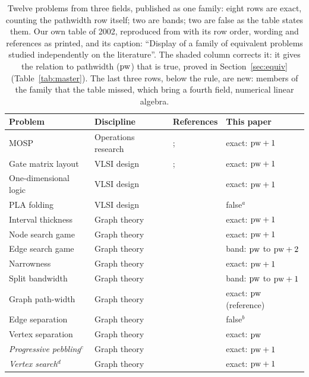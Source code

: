 \begin{table}[tbp]
\centering
\caption{Twelve problems from three fields, published as one family: eight
rows are exact, counting the pathwidth row itself; two are bands; two are false
as the table states them. Our own table of 2002, reproduced from
\citet[Table~1, p.~1764]{LY2002} with its row order, wording and references as
printed, and its caption: ``Display of a family of equivalent problems studied
independently on the literature''. The shaded column corrects it: it gives the
relation to pathwidth ($\mathrm{pw}$) that is true, proved in Section~\ref{sec:equiv}
(Table~\ref{tab:master}). The last three rows, below the rule, are new:
members of the family that the table missed, which bring a fourth field,
numerical linear algebra.}
\label{tab:ly2002}
\small
\setlength{\tabcolsep}{3.5pt}
\begin{tabular}{@{}lll>{\columncolor{black!7}}l@{}}
\toprule
Problem & Discipline & References & This paper \\
\midrule
MOSP & Operations research & \citet{Yanasse1997b}; \citet{LY2002ref4} & exact: $\mathrm{pw}+1$ \\
Gate matrix layout & VLSI design & \citet{LY2002ref6}; \citet{LY2002ref8} & exact: $\mathrm{pw}+1$ \\
One-dimensional logic & VLSI design & \citet{LY2002ref7} & exact: $\mathrm{pw}+1$ \\
PLA folding & VLSI design & \citet{LY2002ref6} & false$^{a}$ \\
Interval thickness & Graph theory & \citet{LY2002ref5} & exact: $\mathrm{pw}+1$ \\
Node search game & Graph theory & \citet{LY2002ref9} & exact: $\mathrm{pw}+1$ \\
Edge search game & Graph theory & \citet{LY2002ref10} & band: $\mathrm{pw}$ to $\mathrm{pw}+2$ \\
Narrowness & Graph theory & \citet{LY2002ref11} & exact: $\mathrm{pw}+1$ \\
Split bandwidth & Graph theory & \citet{LY2002ref12} & band: $\mathrm{pw}$ to $\mathrm{pw}+1$ \\
Graph path-width & Graph theory & \citet{LY2002ref13} & exact: $\mathrm{pw}$ (reference) \\
Edge separation & Graph theory & \citet{LY2002ref14} & false$^{b}$ \\
Vertex separation & Graph theory & \citet{LY2002ref13} & exact: $\mathrm{pw}$ \\
\midrule
\emph{Progressive pebbling}$^{c}$ & Graph theory & \citet{LY2002ref10} & exact: $\mathrm{pw}+1$ \\
\emph{Vertex search}$^{d}$ & Graph theory & \citet{BRST1991} & exact: $\mathrm{pw}+1$ \\

\end{tabular}
\end{table}
